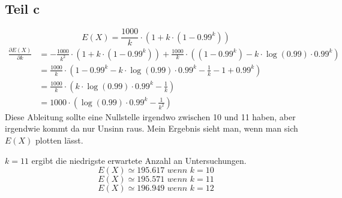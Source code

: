 \documentclass[10pt,a4paper]{article}
\begin{document}
\subsection{Teil c}
\begin{equation}
  E(X) = \frac{1000}{k} \cdot \left( 1 + k \cdot \left( 1 - 0.99^{k} \right) \right)
\end{equation}
\begin{align*}
  \frac{\partial E(X)}{\partial k} & = -\frac{1000}{k^{2}} \cdot \left( 1 + k \cdot \left( 1 - 0.99^{k} \right) \right) + \frac{1000}{k} \cdot ((1 - 0.99^{k}) - k \cdot \log(0.99) \cdot 0.99^{k})\\
  & = \frac{1000}{k} \cdot \left( 1 - 0.99^{k} - k \cdot \log(0.99) \cdot 0.99^{k} - \frac{1}{k} - 1 + 0.99^{k} \right)\\
  & = \frac{1000}{k} \cdot \left( k \cdot \log(0.99) \cdot 0.99^{k} - \frac{1}{k} \right)\\
  & = 1000 \cdot \left( \log(0.99) \cdot 0.99^{k} - \frac{1}{k^{2}} \right)
\end{align*}
Diese Ableitung sollte eine Nullstelle irgendwo zwischen 10 und 11 haben, aber irgendwie kommt da nur Unsinn raus.
Mein Ergebnis sieht man, wenn man sich $E(X)$ plotten lässt.

$k = 11$ ergibt die niedrigste erwartete Anzahl an Untersuchungen.
\begin{equation}
  E(X) \simeq 195.617 \textit{ wenn $k = 10$}
\end{equation}
\begin{equation}
  E(X) \simeq 195.571 \textit{ wenn $k = 11$}
\end{equation}
\begin{equation}
  E(X) \simeq 196.949 \textit{ wenn $k = 12$}
\end{equation}
\end{document}
